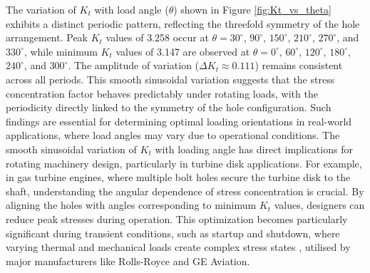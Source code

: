 \documentclass[a4paper,11pt]{article}
\begin{document}
The variation of $K_t$ with load angle ($\theta$) shown in Figure \ref{fig:Kt_vs_theta}  exhibits a distinct periodic pattern, reflecting the threefold symmetry of the hole arrangement. Peak $K_t$ values of 3.258 occur at $\theta = 30^\circ$, $90^\circ$, $150^\circ$, $210^\circ$, $270^\circ$, and $330^\circ$, while minimum $K_t$ values of 3.147 are observed at $\theta = 0^\circ$, $60^\circ$, $120^\circ$, $180^\circ$, $240^\circ$, and $300^\circ$. The amplitude of variation ($\Delta K_t \approx 0.111$) remains consistent across all periods. This smooth sinusoidal variation suggests that the stress concentration factor behaves predictably under rotating loads, with the periodicity directly linked to the symmetry of the hole configuration. Such findings are essential for determining optimal loading orientations in real-world applications, where load angles may vary due to operational conditions. The smooth sinusoidal variation of $K_t$ with loading angle has direct implications for rotating machinery design, particularly in turbine disk applications. For example, in gas turbine engines, where multiple bolt holes secure the turbine disk to the shaft, understanding the angular dependence of stress concentration is crucial\cite{norton2019machine}. By aligning the holes \cite{meguid1995finite} with angles corresponding to minimum $K_t$ values, designers can reduce peak stresses during operation. This optimization becomes particularly significant during transient conditions, such as startup and shutdown\cite{rao2011mechanical}, where varying thermal and mechanical loads create complex stress states ,  utilised by major manufacturers like Rolls-Royce and GE Aviation. 

  

 
\end{document}
